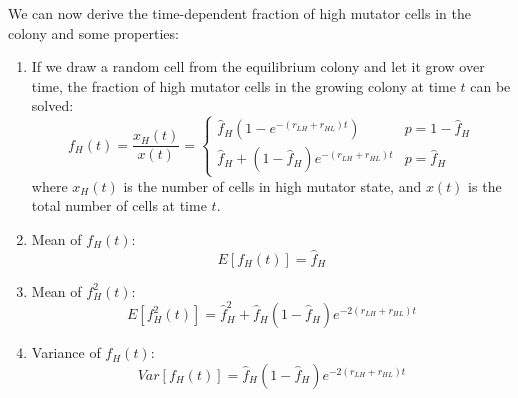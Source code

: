 We can now derive the time-dependent fraction of high mutator cells in the colony and some properties:
\begin{enumerate}
    \item If we draw a random cell from the equilibrium colony and let it grow over time, the fraction of high mutator cells in the growing colony at time $t$ can be solved:
        \begin{equation}
            f_{H}(t) = \frac{x_{H}(t)}{x(t)} = \begin{cases}
            \hat{f}_{H} \left(1 - e^{-(r_{LH} + r_{HL})t}\right) & p = 1 - \hat{f}_{H} \\
            \hat{f}_{H} + \left(1 - \hat{f}_{H}\right) e^{-(r_{LH} + r_{HL})t} & p = \hat{f}_{H}
            \end{cases}\label{eq:time-dependent-fH}
        \end{equation}
    where $x_{H}(t)$ is the number of cells in high mutator state, and $x(t)$ is the total number of cells at time $t$.
    \item Mean of $f_{H}(t)$:
        \begin{equation}
            E[f_{H}(t)] = \hat{f}_{H}
            \label{eq:mean-fH}
        \end{equation}
    \item Mean of \( f_{H}^{2}(t) \):
        \begin{equation}
            E[f_{H}^{2}(t)] = \hat{f}_{H}^{2} + \hat{f}_{H} \left(1 - \hat{f}_{H}\right) e^{-2(r_{LH} + r_{HL})t}
            \label{eq:mean-fH2}
        \end{equation}
    \item Variance of $f_{H}(t)$:
        \begin{equation}
            Var\left[f_{H}(t)\right] = \hat{f}_{H} \left(1 - \hat{f}_{H}\right) e^{-2(r_{LH} + r_{HL})t}
            \label{eq:var-fH}
        \end{equation}
\end{enumerate}